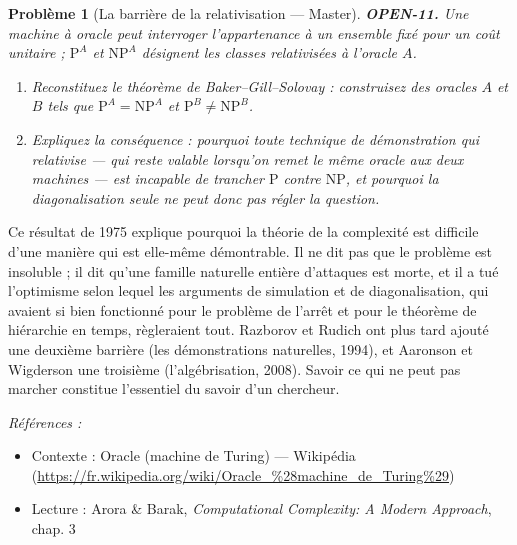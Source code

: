 \documentclass[11pt]{article}
\newtheorem{problem}{Problème}
\newenvironment{refs}{\par\small\noindent\emph{Références :}\begin{itemize}\setlength\itemsep{0pt}}{\end{itemize}\normalsize}
\begin{document}
\bigskip

\begin{problem}[{La barrière de la relativisation --- Master}]
\textbf{OPEN-11.} Une machine à oracle peut interroger l'appartenance à un ensemble fixé
pour un coût unitaire ; $ \mathrm{P}^{A} $ et $ \mathrm{NP}^{A} $ désignent les
classes relativisées à l'oracle $ A $.
\begin{enumerate}
\item[(a)] Reconstituez le théorème de Baker--Gill--Solovay : construisez des oracles $ A $ et
$ B $ tels que $ \mathrm{P}^{A} = \mathrm{NP}^{A} $ et
$ \mathrm{P}^{B} \neq \mathrm{NP}^{B} $.
\item[(b)] Expliquez la conséquence : pourquoi toute technique de démonstration qui \og{} relativise \fg{}
--- qui reste valable lorsqu'on remet le même oracle aux deux machines --- est incapable de
trancher $ \mathrm{P} $ contre $ \mathrm{NP} $, et pourquoi la diagonalisation seule
ne peut donc pas régler la question.
\end{enumerate}

\end{problem}

\noindent Ce résultat de 1975 explique pourquoi la théorie de la complexité est
difficile d'une manière qui est elle-même démontrable. Il ne dit pas que le problème est
insoluble ; il dit qu'une famille naturelle entière d'attaques est morte, et il a tué
l'optimisme selon lequel les arguments de simulation et de diagonalisation, qui avaient si
bien fonctionné pour le problème de l'arrêt et pour le théorème de hiérarchie en temps,
règleraient tout. Razborov et Rudich ont plus tard ajouté une deuxième barrière (les
démonstrations naturelles, 1994), et Aaronson et Wigderson une troisième
(l'algébrisation, 2008). Savoir ce qui ne peut pas marcher constitue l'essentiel du savoir
d'un chercheur.

\begin{refs}
\item Contexte : Oracle (machine de Turing) --- Wikipédia (\url{https://fr.wikipedia.org/wiki/Oracle_%28machine_de_Turing%29})
\item Lecture : Arora \& Barak, \textit{Computational Complexity: A Modern Approach}, chap. 3
\end{refs}

\bigskip
\end{document}
